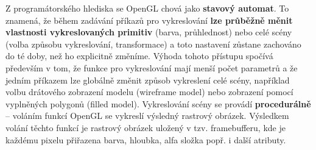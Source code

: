 Z programátorského hlediska se OpenGL chová jako \textbf{stavový automat}. To znamená, že během zadávání příkazů pro vykreslování \textbf{lze průběžně měnit vlastnosti vykreslovaných primitiv} (barva, průhlednost) nebo celé scény (volba způsobu vykreslování, transformace) a toto nastavení zůstane zachováno do té doby, než ho explicitně změníme. Výhoda tohoto přístupu spočívá především v tom, že funkce pro vykreslování mají menší počet parametrů a že jedním příkazem lze globálně změnit způsob vykreslení celé scény, například volbu drátového zobrazení modelu (wireframe model) nebo zobrazení pomocí vyplněných polygonů (filled model). Vykreslování scény se provádí \textbf{procedurálně} – voláním funkcí OpenGL se vykreslí výsledný rastrový obrázek. Výsledkem volání těchto funkcí je rastrový obrázek uložený v tzv. framebufferu, kde je každému pixelu přiřazena barva, hloubka, alfa složka popř. i další atributy. 
